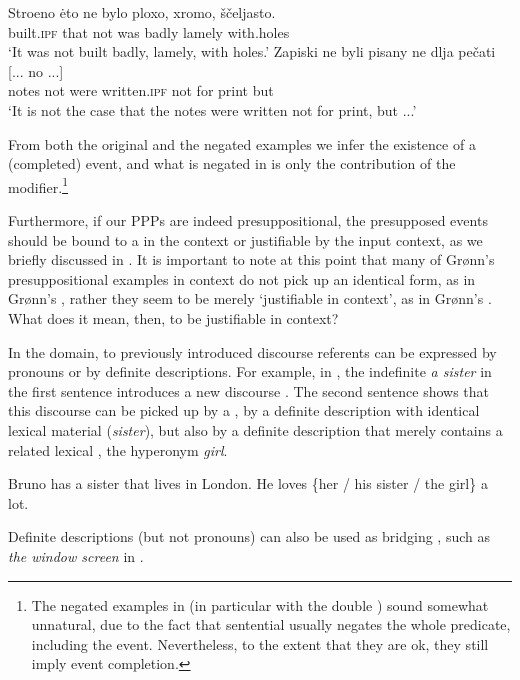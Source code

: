 \documentclass[output=paper,modfonts,newtxmath,hidelinks
\ChapterDOI{10.5281/zenodo.2545513}
]{langscibook}
\begin{document}
\ea\label{stroenoneg}
\ea\gll 	Stroeno \.{e}to ne bylo ploxo, xromo, ščeljasto. \\
	built.\textsc{ipf} that not was badly lamely with.holes\\
 \glt   `It was not built badly, lamely, with holes.'
\ex\gll 	Zapiski ne byli pisany ne dlja pečati [... no ...]	\\
	notes not were written.\textsc{ipf} not for print          {}       but {}\\
\glt    `It is not the case that the notes were written not for print, but ...'\label{stroenonegb}
\z\z

\noindent From both the original and the negated examples we infer the existence of a (completed) event, and what is negated in  is only the contribution of the modifier.\footnote{The negated examples in  (in particular  with the double ) sound somewhat unnatural, due to the fact that sentential  usually negates the whole predicate, including the event. Nevertheless, to the extent that they are ok, they still imply event completion.}

Furthermore, if our  PPPs are indeed presuppositional, the presupposed events should be bound to a  in the context or justifiable by the input context, as we briefly discussed in . It is important to note at this point that many of Grønn's presuppositional  examples in context do not pick up an identical  form, as in Grønn's , rather they seem to be merely `justifiable in context', as in Grønn's .  What does it mean, then, to be justifiable in context? 

In the  domain,  to previously introduced discourse referents can be expressed by pronouns or by definite descriptions. For example, in , the indefinite \textit{a sister} in the first sentence introduces a new discourse . The second sentence shows that this discourse  can be picked up by a , by a definite description with identical lexical material (\textit{sister}), but also by a definite description that merely contains a related lexical , the hyperonym \textit{girl}. 

\ea Bruno has a sister that lives in London. He loves \{her / his sister / the girl\} a lot.\label{Bruno}
\z

\noindent Definite descriptions (but not pronouns) can also be used as bridging , such as \textit{the window screen} in .
\end{document}
